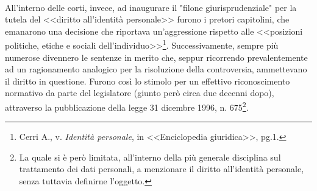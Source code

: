 \\All'interno delle corti, invece, ad inaugurare il "filone giurisprudenziale" per la tutela del <<diritto all'identità personale>> furono i pretori capitolini, che emanarono una decisione che riportava un'aggressione rispetto alle <<posizioni politiche, etiche e sociali dell'individuo>>\footnote{Cerri A., v. \textit{Identità personale}, in <<Enciclopedia giuridica>>, pg.1.}. Successivamente, sempre più numerose divennero le sentenze in merito che, seppur ricorrendo prevalentemente ad un ragionamento analogico per la risoluzione della controversia, ammettevano il diritto in questione.
Furono così lo stimolo per un effettivo riconoscimento normativo da parte del legislatore (giunto però circa due decenni dopo), attraverso la pubblicazione della legge 31 dicembre 1996, n. 675\footnote{La quale si è però limitata, all’interno della più generale disciplina sul trattamento dei dati personali, a menzionare il diritto all’identità personale, senza tuttavia definirne l’oggetto.}.

